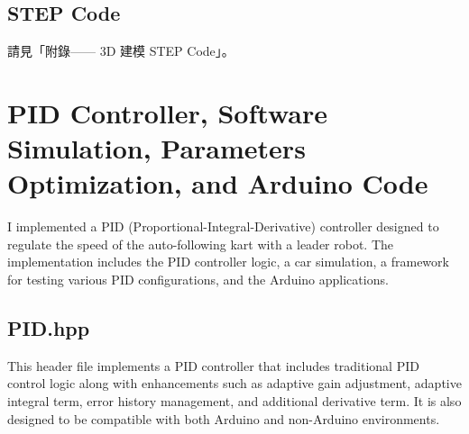 \documentclass[a4paper,12pt]{./article}
\begin{document}
\begin{center}\begin{figure}[H]\centering{}\end{figure}\FloatBarrier\end{center}
\begin{center}\begin{figure}[H]\centering{}\end{figure}\FloatBarrier\end{center}
\begin{center}\begin{figure}[H]\centering{}\end{figure}\FloatBarrier\end{center}
\begin{center}\begin{figure}[H]\centering{}\end{figure}\FloatBarrier\end{center}
\begin{center}\begin{figure}[H]\centering{}\end{figure}\FloatBarrier\end{center}
\subsection{STEP Code}
請見「附錄—— 3D 建模 STEP Code」。

\section{PID Controller, Software Simulation, Parameters Optimization, and Arduino Code}
I implemented a PID (Proportional-Integral-Derivative) controller designed to regulate the speed of the auto-following kart with a leader robot. The implementation includes the PID controller logic, a car simulation, a framework for testing various PID configurations, and the Arduino applications.
\subsection{PID.hpp}
This header file implements a PID controller that includes traditional PID control logic along with enhancements such as adaptive gain adjustment, adaptive integral term, error history management, and additional derivative term. It is also designed to be compatible with both Arduino and non-Arduino environments.
\end{document}

